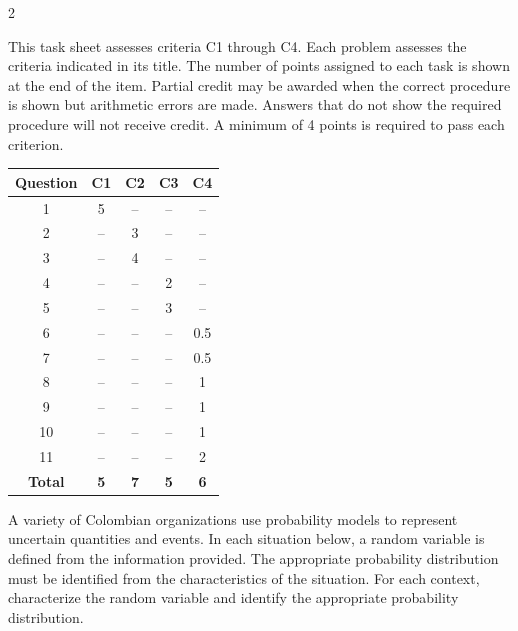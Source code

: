 	\begin{multicols}{2}
		
		This task sheet assesses criteria C1 through C4. Each problem assesses
		the criteria indicated in its title. The number of points assigned to
		each task is shown at the end of the item. Partial credit may be awarded
		when the correct procedure is shown but arithmetic errors are made.
		Answers that do not show the required procedure will not receive credit.
		A minimum of 4 points is required to pass each criterion.
		
		\vspace*{-4mm}
		\begin{center}
			\begin{tabular}{|c|c|c|c|c|}
				\hline
				\textbf{Question} & \textbf{C1} & \textbf{C2} & \textbf{C3} & \textbf{C4} \\ \hline
				1 & 5 & -- & -- & -- \\ \hline
				2 & -- & 3 & -- & -- \\ \hline
				3 & -- & 4 & -- & -- \\ \hline
				4 & -- & -- & 2 & -- \\ \hline
				5 & -- & -- & 3 & -- \\ \hline
				6 & -- & -- & -- & 0.5 \\ \hline
				7 & -- & -- & -- & 0.5 \\ \hline
				8 & -- & -- & -- & 1 \\ \hline
				9 & -- & -- & -- & 1 \\ \hline
				10 & -- & -- & -- & 1 \\ \hline
				11 & -- & -- & -- & 2 \\ \hline
				\textbf{Total} & \textbf{5} & \textbf{7} & \textbf{5} & \textbf{6} \\ \hline
			\end{tabular}
		\end{center}
		\vspace*{-6mm}
		
		\columnbreak
		
		{
			A variety of Colombian organizations use probability models to represent
			uncertain quantities and events. In each situation below, a random
			variable is defined from the information provided. The appropriate
			probability distribution must be identified from the characteristics
			of the situation. For each context, characterize the random variable and identify the appropriate probability distribution. 
			
}
\end{multicols}

